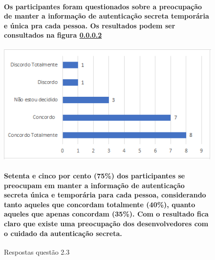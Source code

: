 \begin{figure}[!t]
\centering

\paragraph{
Os participantes foram questionados sobre a preocupação de manter a informação de autenticação secreta temporária e única pra cada pessoa. Os resultados podem ser consultados na figura \ref{fig:2.3}
}

\includegraphics[scale=0.7]{figuras das questoes/2.3.png}
\caption{Respostas questão 2.3}

\paragraph{
Setenta e cinco por cento (75{\%}) dos participantes se preocupam em manter a informação de autenticação secreta única e temporária para cada pessoa, considerando tanto aqueles que concordam totalmente (40{\%}), quanto aqueles que apenas concordam (35{\%}). Com o resultado fica claro que existe uma preocupação dos desenvolvedores com o cuidado da autenticação secreta.
}

\label{fig:2.3}
\end{figure}

